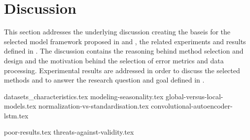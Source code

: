 
\section{Discussion}
\label{section:Discussion:Discussion}

This section addresses the underlying discussion creating the baseis for the selected model framework proposed in  and ,
the related experiments and results defined in .
The discussion contains the reasoning behind method selection and design
and the motivation behind the selection of error metrics and data processing.
Experimental results are addressed in order to discuss the selected methods and to answer the research question and goal defined in .


\iffalse
  This section presents the underlying discussion creating the basis for the model framework proposed in \Cref{section:Architecture}.
  The discussion concerns the current state of time-series prediction, the motivation behind the method selection, model structure, and the selected error metric.
  This section intendeds to answer the research questions proposed in this paper,
  as well as the reason behind the framework.
\fi




{datasets_characteristics.tex}
{modeling-seasonality.tex}
{global-versus-local-models.tex}
{normalization-vs-standardisation.tex}
{convolutional-autoencoder-lstm.tex}


{poor-results.tex}
{threats-against-validity.tex}











